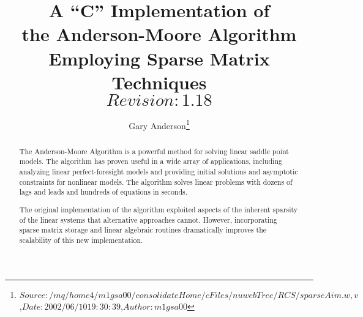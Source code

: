 \documentclass{article}
\begin{document}
\pagestyle{fancyplain}
\addtolength{\headwidth}{\marginparsep}
\addtolength{\headwidth}{\marginparwidth}
\renewcommand{\sectionmark}[1]%
{\markboth{#1}{}}
\renewcommand{\subsectionmark}[1]%
{\markright{\thesection\ #1}}
\lhead[\fancyplain{}{\bfseries\thepage}]%
{\fancyplain{}{\bfseries\rightmark}}%
\rhead[\fancyplain{}{\bfseries\leftmark}]%
{\fancyplain{}{\bfseries\thepage}}%
\cfoot{}



%
%
\title{
A ``C'' Implementation of \\ the Anderson-Moore Algorithm\\
Employing Sparse Matrix Techniques\\$Revision: 1.18 $
}
\author{
Gary Anderson\thanks{$Source: /mq/home4/m1gsa00/consolidateHome/cFiles/nuwebTree/RCS/sparseAim.w,v $,\newline $Date: 2002/06/10 19:30:39 $,\newline $Author: m1gsa00 $}
}
\maketitle


%



\begin{abstract}
  

The Anderson-Moore Algorithm is a powerful method for 
solving linear saddle point
 models. The algorithm has proven useful in a wide array of 
applications, including
 analyzing linear perfect-foresight models and 
providing initial solutions and
 asymptotic constraints for nonlinear models. The algorithm 
solves linear problems with
 dozens of lags and leads and hundreds of equations in seconds. 

The original implementation of the
algorithm exploited aspects of the inherent
sparsity of the linear systems that alternative approaches
cannot. However, incorporating sparse matrix storage and linear
algebraic routines dramatically improves the scalability of this new implementation.


\end{abstract}

\newpage

\tableofcontents 
\listoftables
\listoffigures
\newpage


\nocite{NOBLE}
\nocite{berry}
\nocite{golub89}
\nocite{blanchard80,taylor77,whiteman83}
\nocite{krishnamurthy89}
\end{document}
